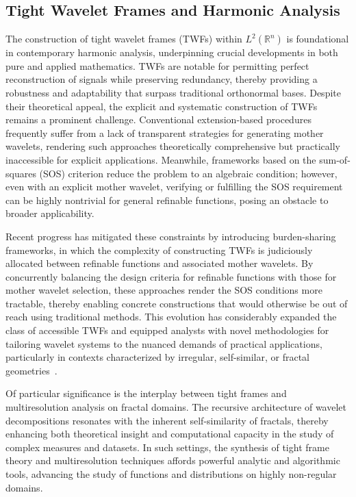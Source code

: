 \documentclass[sigconf]{acmart}
\begin{document}

\subsection{Tight Wavelet Frames and Harmonic Analysis}

The construction of tight wavelet frames (TWFs) within $L^2(\mathbb{R}^n)$ is foundational in contemporary harmonic analysis, underpinning crucial developments in both pure and applied mathematics. TWFs are notable for permitting perfect reconstruction of signals while preserving redundancy, thereby providing a robustness and adaptability that surpass traditional orthonormal bases. Despite their theoretical appeal, the explicit and systematic construction of TWFs remains a prominent challenge. Conventional extension-based procedures frequently suffer from a lack of transparent strategies for generating mother wavelets, rendering such approaches theoretically comprehensive but practically inaccessible for explicit applications. Meanwhile, frameworks based on the sum-of-squares (SOS) criterion reduce the problem to an algebraic condition; however, even with an explicit mother wavelet, verifying or fulfilling the SOS requirement can be highly nontrivial for general refinable functions, posing an obstacle to broader applicability.

Recent progress has mitigated these constraints by introducing burden-sharing frameworks, in which the complexity of constructing TWFs is judiciously allocated between refinable functions and associated mother wavelets. By concurrently balancing the design criteria for refinable functions with those for mother wavelet selection, these approaches render the SOS conditions more tractable, thereby enabling concrete constructions that would otherwise be out of reach using traditional methods. This evolution has considerably expanded the class of accessible TWFs and equipped analysts with novel methodologies for tailoring wavelet systems to the nuanced demands of practical applications, particularly in contexts characterized by irregular, self-similar, or fractal geometries~\cite{ref104}.

Of particular significance is the interplay between tight frames and multiresolution analysis on fractal domains. The recursive architecture of wavelet decompositions resonates with the inherent self-similarity of fractals, thereby enhancing both theoretical insight and computational capacity in the study of complex measures and datasets. In such settings, the synthesis of tight frame theory and multiresolution techniques affords powerful analytic and algorithmic tools, advancing the study of functions and distributions on highly non-regular domains.
\end{document}
